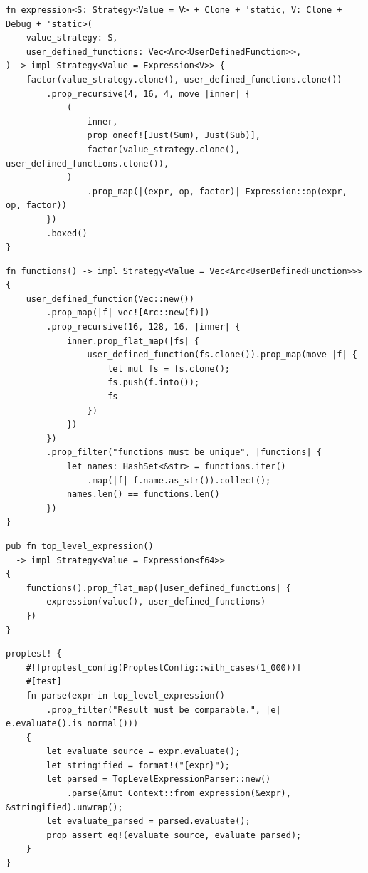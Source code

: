 \begin{frame}[fragile]
    \begin{verbatim}
fn expression<S: Strategy<Value = V> + Clone + 'static, V: Clone + Debug + 'static>(
    value_strategy: S,
    user_defined_functions: Vec<Arc<UserDefinedFunction>>,
) -> impl Strategy<Value = Expression<V>> {
    factor(value_strategy.clone(), user_defined_functions.clone())
        .prop_recursive(4, 16, 4, move |inner| {
            (
                inner,
                prop_oneof![Just(Sum), Just(Sub)],
                factor(value_strategy.clone(), user_defined_functions.clone()),
            )
                .prop_map(|(expr, op, factor)| Expression::op(expr, op, factor))
        })
        .boxed()
}
    \end{verbatim}
\end{frame}


\begin{frame}[fragile]
    \begin{verbatim}
fn functions() -> impl Strategy<Value = Vec<Arc<UserDefinedFunction>>> {
    user_defined_function(Vec::new())
        .prop_map(|f| vec![Arc::new(f)])
        .prop_recursive(16, 128, 16, |inner| {
            inner.prop_flat_map(|fs| {
                user_defined_function(fs.clone()).prop_map(move |f| {
                    let mut fs = fs.clone();
                    fs.push(f.into());
                    fs
                })
            })
        })
        .prop_filter("functions must be unique", |functions| {
            let names: HashSet<&str> = functions.iter()
                .map(|f| f.name.as_str()).collect();
            names.len() == functions.len()
        })
}
    \end{verbatim}
\end{frame}

\begin{frame}[fragile]
    \begin{verbatim}
pub fn top_level_expression()
  -> impl Strategy<Value = Expression<f64>>
{
    functions().prop_flat_map(|user_defined_functions| {
        expression(value(), user_defined_functions)
    })
}
    \end{verbatim}
\end{frame}

\begin{frame}[fragile]
    \begin{verbatim}
proptest! {
    #![proptest_config(ProptestConfig::with_cases(1_000))]
    #[test]
    fn parse(expr in top_level_expression()
        .prop_filter("Result must be comparable.", |e| e.evaluate().is_normal()))
    {
        let evaluate_source = expr.evaluate();
        let stringified = format!("{expr}");
        let parsed = TopLevelExpressionParser::new()
            .parse(&mut Context::from_expression(&expr), &stringified).unwrap();
        let evaluate_parsed = parsed.evaluate();
        prop_assert_eq!(evaluate_source, evaluate_parsed);
    }
}
    \end{verbatim}
\end{frame}

